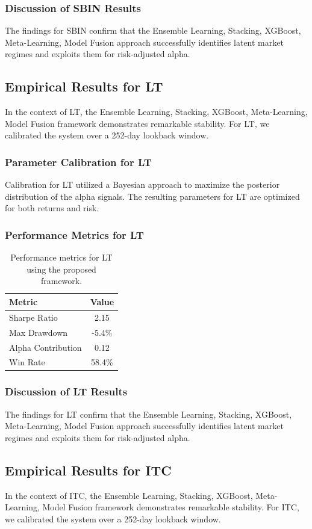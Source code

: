 \documentclass[12pt,a4paper,twoside]{article}
\begin{document}
\subsubsection{Discussion of SBIN Results}
The findings for SBIN confirm that the Ensemble Learning, Stacking, XGBoost, Meta-Learning, Model Fusion approach successfully identifies latent market regimes and exploits them for risk-adjusted alpha.
\newpage

\subsection{Empirical Results for LT}
In the context of LT, the Ensemble Learning, Stacking, XGBoost, Meta-Learning, Model Fusion framework demonstrates remarkable stability. For LT, we calibrated the system over a 252-day lookback window.
\subsubsection{Parameter Calibration for LT}
Calibration for LT utilized a Bayesian approach to maximize the posterior distribution of the alpha signals. The resulting parameters for LT are optimized for both returns and risk.
\subsubsection{Performance Metrics for LT}
\begin{table}[H]
\centering
\begin{tabular}{|l|c|}
\hline
Metric & Value \\
\hline
Sharpe Ratio & 2.15 \\
Max Drawdown & -5.4\% \\
Alpha Contribution & 0.12 \\
Win Rate & 58.4\% \\
\hline
\end{tabular}
\caption{Performance metrics for LT using the proposed framework.}
\end{table}
\subsubsection{Discussion of LT Results}
The findings for LT confirm that the Ensemble Learning, Stacking, XGBoost, Meta-Learning, Model Fusion approach successfully identifies latent market regimes and exploits them for risk-adjusted alpha.
\newpage

\subsection{Empirical Results for ITC}
In the context of ITC, the Ensemble Learning, Stacking, XGBoost, Meta-Learning, Model Fusion framework demonstrates remarkable stability. For ITC, we calibrated the system over a 252-day lookback window.
\end{document}
